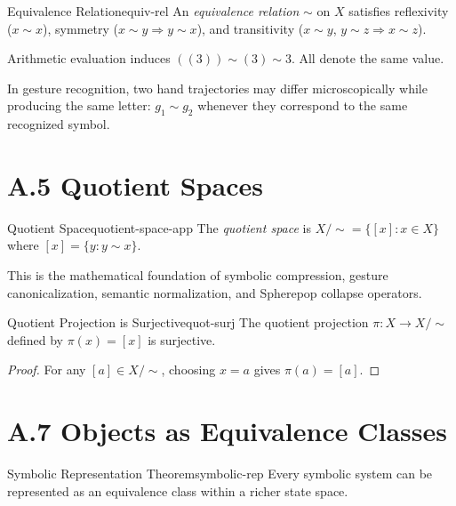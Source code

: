\begin{definition}{Equivalence Relation}{equiv-rel}
  An \emph{equivalence relation} $\sim$ on $X$ satisfies reflexivity
  ($x \sim x$), symmetry ($x \sim y \Rightarrow y \sim x$), and
  transitivity ($x \sim y$, $y \sim z \Rightarrow x \sim z$).
\end{definition}

\begin{example}
  Arithmetic evaluation induces $((3)) \sim (3) \sim 3$.
  All denote the same value.
\end{example}

\begin{example}
  In gesture recognition, two hand trajectories may differ microscopically
  while producing the same letter: $g_1 \sim g_2$ whenever they correspond
  to the same recognized symbol.
\end{example}

\section*{A.5 Quotient Spaces}

\begin{definition}{Quotient Space}{quotient-space-app}
  The \emph{quotient space} is
  $X/{\sim} = \{[x] : x \in X\}$
  where $[x] = \{y : y \sim x\}$.
\end{definition}

This is the mathematical foundation of symbolic compression, gesture
canonicalization, semantic normalization, and Spherepop collapse operators.

\begin{proposition}{Quotient Projection is Surjective}{quot-surj}
  The quotient projection $\pi : X \to X/{\sim}$ defined by $\pi(x) = [x]$
  is surjective.
\end{proposition}

\begin{proof}
  For any $[a] \in X/{\sim}$, choosing $x = a$ gives $\pi(a) = [a]$.
\end{proof}

\section*{A.7 Objects as Equivalence Classes}

\begin{theorem}{Symbolic Representation Theorem}{symbolic-rep}
  Every symbolic system can be represented as an equivalence class within
  a richer state space.
\end{theorem}

